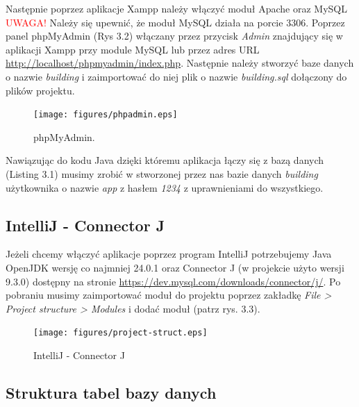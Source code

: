 \newpage
\noindent Następnie poprzez aplikacje Xampp należy włączyć moduł Apache oraz MySQL
\textcolor{red}{UWAGA!} Należy się upewnić, że moduł MySQL działa na porcie 3306.
Poprzez panel phpMyAdmin (Rys 3.2) włączany przez przycisk \textit{Admin} znajdujący się w aplikacji
Xampp przy module MySQL lub przez adres URL  \url{http://localhost/phpmyadmin/index.php}.
Następnie należy stworzyć baze danych o nazwie \textit{building} i zaimportować
do niej plik o nazwie \textit{building.sql} dołączony do plików projektu.

\begin{figure}[H]
    \centering
    \texttt{[image: figures/phpadmin.eps]}\\
    \caption{phpMyAdmin.\label{fig2}}
\end{figure}

\noindent Nawiązując do kodu Java dzięki któremu aplikacja łączy się z bazą danych (Listing 3.1)
musimy zrobić w stworzonej przez nas bazie danych \textit{building} użytkownika o nazwie \textit{app} z hasłem \textit{1234} z uprawnieniami do wszystkiego.


\newpage
\subsection{IntelliJ - Connector J}
Jeżeli chcemy włączyć aplikacje poprzez program IntelliJ potrzebujemy Java OpenJDK wersję co najmniej 24.0.1 oraz Connector J (w projekcie użyto wersji 9.3.0)
dostępny na stronie \url{https://dev.mysql.com/downloads/connector/j/}.
Po pobraniu musimy zaimportować moduł do projektu poprzez zakładkę \textit{File > Project structure > Modules} i dodać moduł (patrz rys. 3.3).

\begin{figure}[H]
    \centering
    \texttt{[image: figures/project-struct.eps]}\\
    \caption{IntelliJ - Connector J\label{fig3}}
\end{figure}

\newpage
\subsection{Struktura tabel bazy danych}

